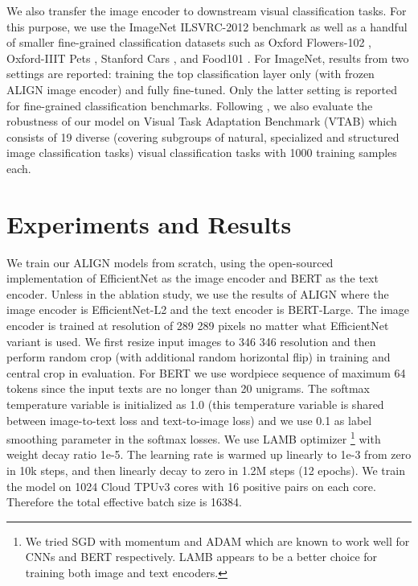 \documentclass{article}
\begin{document}
We also transfer the image encoder to downstream visual classification tasks. For this purpose, we use the  ImageNet ILSVRC-2012 benchmark \cite{deng:imagenet} as well as a handful of smaller fine-grained classification datasets such as Oxford Flowers-102 \cite{nilsback:flowers}, Oxford-IIIT Pets \cite{parkhi:pets}, Stanford Cars \cite{krause:cars196}, and Food101 \cite{bossard:food101}. For ImageNet, results from two settings are reported: training the top classification layer only (with frozen ALIGN image encoder) and fully fine-tuned. Only the latter setting is reported for fine-grained classification benchmarks. Following \citet{kolensnikov:bit}, we also evaluate the robustness of our model on Visual Task Adaptation Benchmark (VTAB) \cite{zhai:vtab} which consists of 19 diverse (covering subgroups of natural, specialized and structured image classification tasks) visual classification tasks with 1000 training samples each. 
\vspace{-0.3cm}
\section{Experiments and Results}\label{sec:experiment_result}

We train our ALIGN models from scratch, using the open-sourced implementation of EfficientNet as the image encoder and BERT as the text encoder. Unless in the ablation study, we use the results of ALIGN where the image encoder is EfficientNet-L2 and the text encoder is BERT-Large.
The image encoder is trained at resolution of 289  289 pixels no matter what EfficientNet variant is used. We first resize input images to 346  346 resolution and then perform random crop (with additional random horizontal flip) in training and central crop in evaluation. For BERT we use wordpiece sequence of maximum 64 tokens since the input texts are no longer than 20 unigrams. The softmax temperature variable is initialized as 1.0 (this temperature variable is shared between image-to-text loss and text-to-image loss) and we use 0.1 as label smoothing parameter in the softmax losses. We use LAMB optimizer \cite{you:lamb}\footnote{We tried SGD with momentum and ADAM which are known to work well for CNNs and BERT respectively. LAMB appears to be a better choice for training both image and text encoders.} with weight decay ratio 1e-5. The learning rate is warmed up linearly to 1e-3 from zero in 10k steps, and then linearly decay to zero in 1.2M steps (12 epochs). We train the model on 1024 Cloud TPUv3 cores with 16 positive pairs on each core. Therefore the total effective batch size is 16384.
\end{document}
